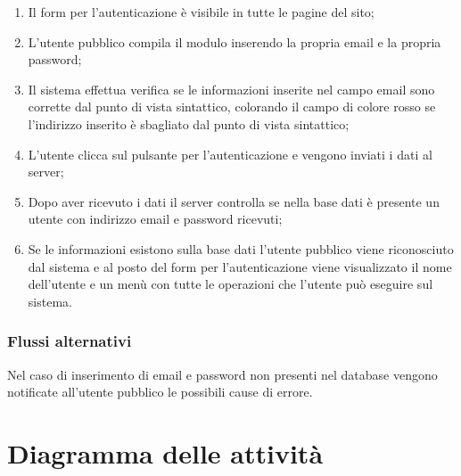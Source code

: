 	\begin{enumerate}
		
		\item
		Il form per l'autenticazione è visibile in tutte le pagine del sito;
		
		\item
		L'utente pubblico compila il modulo inserendo la propria email e la propria password;
		
		\item
		Il sistema effettua verifica se le informazioni inserite nel campo email sono corrette dal punto di vista sintattico, colorando il campo di colore rosso se l'indirizzo inserito è sbagliato dal punto di vista sintattico;
		
		\item
		L'utente clicca sul pulsante per l'autenticazione e vengono inviati i dati al server;
		
		\item
		Dopo aver ricevuto i dati il server controlla se nella base dati è presente un utente con indirizzo email e password ricevuti;
		
		\item
		Se le informazioni esistono sulla base dati l'utente pubblico viene riconosciuto dal sistema e al posto del form per l'autenticazione viene visualizzato il nome dell'utente e un menù con tutte le operazioni che l'utente può eseguire sul sistema.
		
	\end{enumerate}
	
	\subsubsection*{Flussi alternativi}
	Nel caso di inserimento di email e password non presenti nel database vengono notificate all'utente pubblico le possibili cause di errore.

\section{Diagramma delle attività}
\lipsum[3]